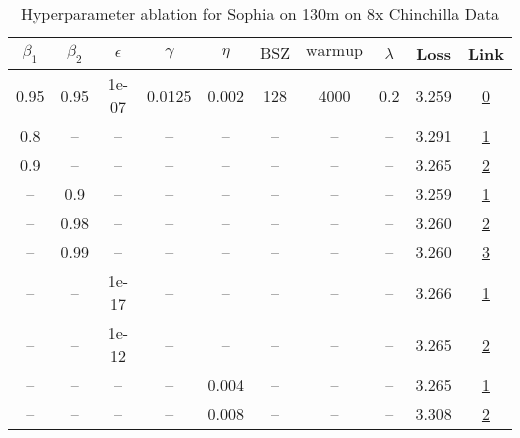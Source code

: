\begin{table}[H]
\centering
\caption{Hyperparameter ablation for Sophia on 130m on 8x Chinchilla Data}
\label{tab:ablation_sophia_130m_on_8x_chinchilla_data}
\begin{tabular}{cccccccccc}
\toprule
$\beta_1$ & $\beta_2$ & $\epsilon$ & $\gamma$ & $\eta$ & $\mathrm{BSZ}$ & $\mathrm{warmup}$ & $\lambda$ & Loss & Link \\
\midrule
0.95 & 0.95 & 1e-07 & 0.0125 & 0.002 & 128 & 4000 & 0.2 & 3.259 & \href{https://wandb.ai/stanford-mercury/optimizer-scaling/runs/sweep-130m-21B-sophia8d270alr0.002-wd0.2-minlr0-warmup4000-b10.9-728991}{0} \\
\midrule
0.8 & -- & -- & -- & -- & -- & -- & -- & 3.291 & \href{https://wandb.ai/stanford-mercury/optimizer-scaling/runs/sweep-130m-21B-sophiaaa290clr0.002-wd0.2-minlr0-warmup4000-b10.8-82d393}{1} \\
0.9 & -- & -- & -- & -- & -- & -- & -- & 3.265 & \href{https://wandb.ai/stanford-mercury/optimizer-scaling/runs/sweep-130m-21B-sophia87ebc2lr0.002-wd0.2-minlr0-warmup4000-b10.9-e413d1}{2} \\
-- & 0.9 & -- & -- & -- & -- & -- & -- & 3.259 & \href{https://wandb.ai/stanford-mercury/optimizer-scaling/runs/sweep-130m-21B-sophiaa3b59clr0.002-wd0.2-minlr0-warmup4000-b10.9-c08a34}{1} \\
-- & 0.98 & -- & -- & -- & -- & -- & -- & 3.260 & \href{https://wandb.ai/stanford-mercury/optimizer-scaling/runs/sweep-130m-21B-sophia6c3357lr0.002-wd0.2-minlr0-warmup4000-b10.9-daeacb}{2} \\
-- & 0.99 & -- & -- & -- & -- & -- & -- & 3.260 & \href{https://wandb.ai/stanford-mercury/optimizer-scaling/runs/sweep-130m-21B-sophia38a997lr0.002-wd0.2-minlr0-warmup4000-b10.9-184cfb}{3} \\
-- & -- & 1e-17 & -- & -- & -- & -- & -- & 3.266 & \href{https://wandb.ai/stanford-mercury/optimizer-scaling/runs/sweep-130m-21B-sophia50bc78lr0.002-wd0.2-minlr0-warmup4000-b10.9-206787}{1} \\
-- & -- & 1e-12 & -- & -- & -- & -- & -- & 3.265 & \href{https://wandb.ai/stanford-mercury/optimizer-scaling/runs/sweep-130m-21B-sophia80e81dlr0.002-wd0.2-minlr0-warmup4000-b10.9-43e123}{2} \\
-- & -- & -- & -- & 0.004 & -- & -- & -- & 3.265 & \href{https://wandb.ai/stanford-mercury/optimizer-scaling/runs/sweep-130m-21B-sophia25d3f7lr0.004-wd0.2-minlr0-warmup4000-b10.9-28a07e}{1} \\
-- & -- & -- & -- & 0.008 & -- & -- & -- & 3.308 & \href{https://wandb.ai/stanford-mercury/optimizer-scaling/runs/sweep-130m-21B-sophia6ff3cdlr0.008-wd0.2-minlr0-warmup4000-b10.9-7fae63}{2} \\

\end{tabular}
\end{table}
